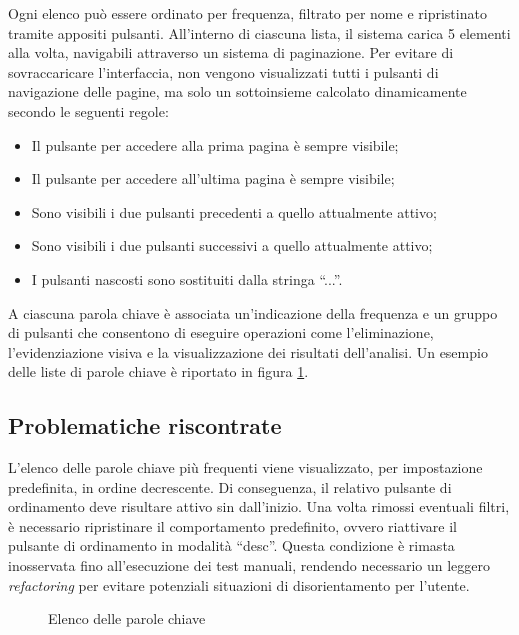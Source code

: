 \vspace{5pt}
\noindent Ogni elenco può essere ordinato per frequenza, filtrato per nome e ripristinato tramite appositi pulsanti. All’interno di ciascuna lista, il sistema carica 5 elementi alla volta, navigabili attraverso un sistema di paginazione. Per evitare di sovraccaricare l’interfaccia, non vengono visualizzati tutti i pulsanti di navigazione delle pagine, ma solo un sottoinsieme calcolato dinamicamente secondo le seguenti regole:
\begin{itemize}
  \item Il pulsante per accedere alla prima pagina è sempre visibile;
  \item Il pulsante per accedere all’ultima pagina è sempre visibile;
  \item Sono visibili i due pulsanti precedenti a quello attualmente attivo;
  \item Sono visibili i due pulsanti successivi a quello attualmente attivo;
  \item I pulsanti nascosti sono sostituiti dalla stringa “...”.
\end{itemize}

\vspace{5pt}
\noindent A ciascuna parola chiave è associata un’indicazione della frequenza e un gruppo di pulsanti che consentono di eseguire operazioni come l’eliminazione, l’evidenziazione visiva e la visualizzazione dei risultati dell’analisi. Un esempio delle liste di parole chiave è riportato in figura \ref{fig:keyword_list}.

\subsection{Problematiche riscontrate}

L’elenco delle parole chiave più frequenti viene visualizzato, per impostazione predefinita, in ordine decrescente. Di conseguenza, il relativo pulsante di ordinamento deve risultare attivo sin dall’inizio. Una volta rimossi eventuali filtri, è necessario ripristinare il comportamento predefinito, ovvero riattivare il pulsante di ordinamento in modalità “desc”. Questa condizione è rimasta inosservata fino all’esecuzione dei test manuali, rendendo necessario un leggero \textit{refactoring} per evitare potenziali situazioni di disorientamento per l’utente.

\begin{figure}[H]
  \centering 
  \caption{Elenco delle parole chiave}
  \label{fig:keyword_list}
\end{figure}